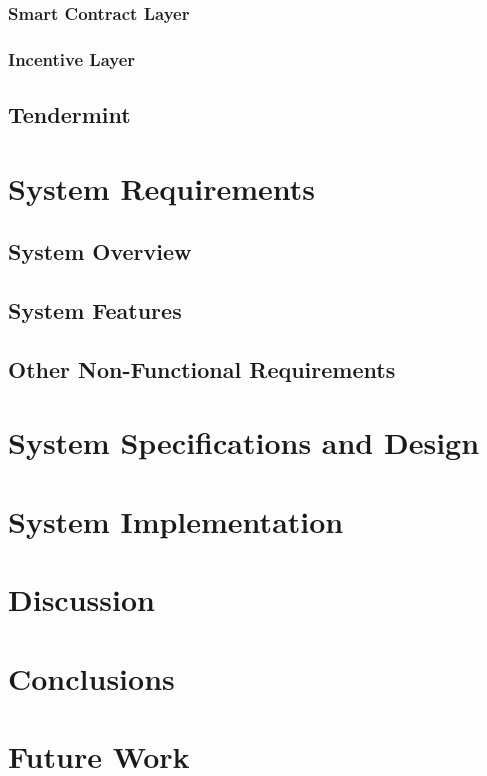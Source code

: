 \documentclass[a4paper,twoside,phd]{BYUPhys}
\begin{document}
\subsection{Smart Contract Layer}
\subsection{Incentive Layer}

\section{Tendermint}

\label{chap:LitReview}

\chapter{System Requirements}
\label{chap:singleuser}

\section{System Overview \label{sec:Intro-ChapUserSelec}}

\section{System Features \label{sect:chap2sysmodel}}

\section{Other Non-Functional Requirements}

\chapter{System Specifications and Design}
\label{chap:Conclusions}
\chapter{System Implementation}
\chapter{Discussion}
\chapter{Conclusions}
\chapter{Future Work}
\end{document}
